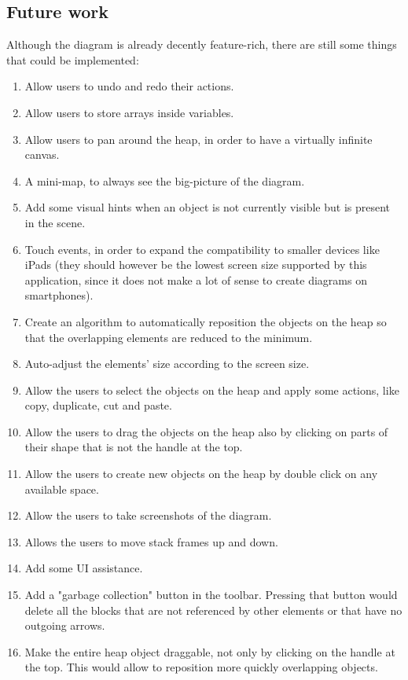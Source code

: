 \documentclass[]{usiinfbachelorproject}
\begin{document}
\subsection{Future work} \label{future work}

Although the diagram is already decently feature-rich, there are still some things that could be implemented:

\begin{enumerate}
	\item Allow users to undo and redo their actions.
	\item Allow users to store arrays inside variables.
	\item Allow users to pan around the heap, in order to have a virtually infinite canvas.
	\item A mini-map, to always see the big-picture of the diagram.
	\item Add some visual hints when an object is not currently visible but is present in the scene.
	\item Touch events, in order to expand the compatibility to 	smaller devices like iPads (they should however be the lowest screen size supported by this application, since it does not make a lot of sense to create diagrams on smartphones).
	\item Create an algorithm to automatically reposition the objects on the heap so that the overlapping elements are reduced to the minimum.
	\item Auto-adjust the elements' size according to the screen size.
	\item Allow the users to select the objects on the heap and apply some actions, like copy, duplicate, cut and paste.
	\item Allow the users to drag the objects on the heap also by clicking on parts of their shape that is not the handle at the top.
	\item Allow the users to create new objects on the heap by double click on any available space.
	\item Allow the users to take screenshots of the diagram.
	\item Allows the users to move stack frames up and down.
	\item Add some UI assistance.
	\item Add a "garbage collection" button in the toolbar. Pressing that button would delete all the blocks that are not referenced by other elements or that have no outgoing arrows.
	\item Make the entire heap object draggable, not only by clicking on the handle at the top. This would allow to reposition more quickly overlapping objects. 
\end{enumerate}
\end{document}
